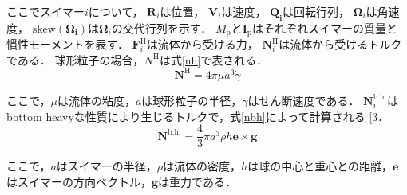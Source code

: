 \documentclass[twocolumns,10pt,a4j]{jarticle}
\makeatletter
\DeclareRobustCommand\cite{\unskip
  \@ifnextchar[{\@tempswatrue\@citex}{\@tempswafalse\@citex[]}}
\makeatother
\begin{document}
  \noindent
ここでスイマー$i$について，
$\boldsymbol{R}_i$は位置，
$\boldsymbol{V}_i$は速度，
$\boldsymbol{Q_i}$は回転行列，
$\boldsymbol{\Omega}_i$は角速度，
$\mathrm{skew} (\boldsymbol{\Omega_i})$は$\boldsymbol{\Omega}_i$の交代行列を示す．
$M_\mathrm{p}$と$\boldsymbol{I}_\mathrm{p}$はそれぞれスイマーの質量と慣性モーメントを表す．
$\boldsymbol{F}_i^\mathrm{H}$は流体から受ける力，
$\boldsymbol{N}_i^\mathrm{H}$は流体から受けるトルクである．
球形粒子の場合，$N^\mathrm{H}$は式\eqref{nh}で表される．
  \vspace{-3truemm}
  \begin{equation}
    \boldsymbol{N^\mathrm{H}} = 4 \pi \mu a^3 \dot{\gamma}
    \label{nh}
  \end{equation}
  \vspace{-6truemm}

  \noindent
ここで，$\mu$は流体の粘度，$a$は球形粒子の半径，$\dot{\gamma}$はせん断速度である．
$\boldsymbol{N}_i^\mathrm{b.h.}$はbottom heavyな性質により生じるトルクで，式\eqref{nbh}によって計算される\cite{3}．
  \vspace{-3truemm}
  \begin{equation}
    \boldsymbol{N}^\mathrm{b.h.} = \frac{4}{3} \pi a^3 \rho h \boldsymbol{e} \times \boldsymbol{g}
    \label{nbh}
  \end{equation}
  \vspace{-4truemm}

  \noindent
ここで，$a$はスイマーの半径，$\rho$は流体の密度，$h$は球の中心と重心との距離，$\boldsymbol{e}$はスイマーの方向ベクトル，$\boldsymbol{g}$は重力である．

\end{document}

